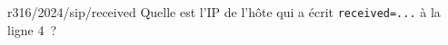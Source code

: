 \begin{question}{r316/2024/sip/received}
  Quelle est l'IP de l'hôte qui a écrit {\tt received=...} à la
  ligne 4~?
  \begin{reponses}[4]
    \lastchoices
  \end{reponses}
\end{question}